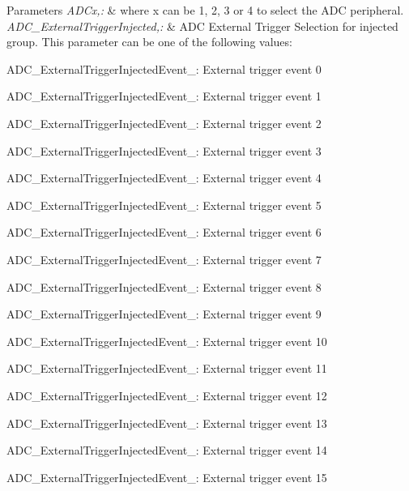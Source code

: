 \begin{DoxyParams}{Parameters}
{\em A\-D\-Cx,\-:} & where x can be 1, 2, 3 or 4 to select the A\-D\-C peripheral. \\
\hline
{\em A\-D\-C\-\_\-\-External\-Trigger\-Injected,\-:} & A\-D\-C External Trigger Selection for injected group. This parameter can be one of the following values\-: \begin{DoxyItemize}
\item A\-D\-C\-\_\-\-External\-Trigger\-Injected\-Event\-\_\-: External trigger event 0 \item A\-D\-C\-\_\-\-External\-Trigger\-Injected\-Event\-\_\-: External trigger event 1 \item A\-D\-C\-\_\-\-External\-Trigger\-Injected\-Event\-\_\-: External trigger event 2 \item A\-D\-C\-\_\-\-External\-Trigger\-Injected\-Event\-\_\-: External trigger event 3 \item A\-D\-C\-\_\-\-External\-Trigger\-Injected\-Event\-\_\-: External trigger event 4 \item A\-D\-C\-\_\-\-External\-Trigger\-Injected\-Event\-\_\-: External trigger event 5 \item A\-D\-C\-\_\-\-External\-Trigger\-Injected\-Event\-\_\-: External trigger event 6 \item A\-D\-C\-\_\-\-External\-Trigger\-Injected\-Event\-\_\-: External trigger event 7 \item A\-D\-C\-\_\-\-External\-Trigger\-Injected\-Event\-\_\-: External trigger event 8 \item A\-D\-C\-\_\-\-External\-Trigger\-Injected\-Event\-\_\-: External trigger event 9 \item A\-D\-C\-\_\-\-External\-Trigger\-Injected\-Event\-\_\-: External trigger event 10 \item A\-D\-C\-\_\-\-External\-Trigger\-Injected\-Event\-\_\-: External trigger event 11 \item A\-D\-C\-\_\-\-External\-Trigger\-Injected\-Event\-\_\-: External trigger event 12 \item A\-D\-C\-\_\-\-External\-Trigger\-Injected\-Event\-\_\-: External trigger event 13 \item A\-D\-C\-\_\-\-External\-Trigger\-Injected\-Event\-\_\-: External trigger event 14 \item A\-D\-C\-\_\-\-External\-Trigger\-Injected\-Event\-\_\-: External trigger event 15 \end{DoxyItemize}
\\

\end{DoxyParams}
